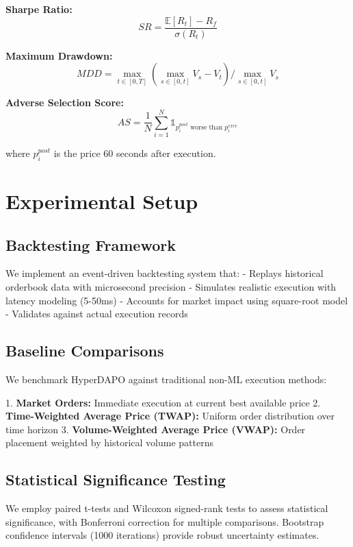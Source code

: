 \documentclass{report}
\begin{document}
\textbf{Sharpe Ratio:}
\begin{equation}
SR = \frac{\mathbb{E}[R_t] - R_f}{\sigma(R_t)}
\end{equation}

\textbf{Maximum Drawdown:}
\begin{equation}
MDD = \max_{t \in [0,T]} \left( \max_{s \in [0,t]} V_s - V_t \right) / \max_{s \in [0,t]} V_s
\end{equation}

\textbf{Adverse Selection Score:}
\begin{equation}
AS = \frac{1}{N} \sum_{i=1}^{N} \mathbb{1}_{p^{post}_i \text{ worse than } p^{exec}_i}
\end{equation}

where $p^{post}_i$ is the price 60 seconds after execution.

\section{Experimental Setup}

\subsection{Backtesting Framework}

We implement an event-driven backtesting system that:
- Replays historical orderbook data with microsecond precision
- Simulates realistic execution with latency modeling (5-50ms)
- Accounts for market impact using square-root model
- Validates against actual execution records

\subsection{Baseline Comparisons}

We benchmark HyperDAPO against traditional non-ML execution methods:

1. \textbf{Market Orders:} Immediate execution at current best available price
2. \textbf{Time-Weighted Average Price (TWAP):} Uniform order distribution over time horizon
3. \textbf{Volume-Weighted Average Price (VWAP):} Order placement weighted by historical volume patterns

\subsection{Statistical Significance Testing}

We employ paired t-tests and Wilcoxon signed-rank tests to assess statistical significance, with Bonferroni correction for multiple comparisons. Bootstrap confidence intervals (1000 iterations) provide robust uncertainty estimates.
\end{document}
